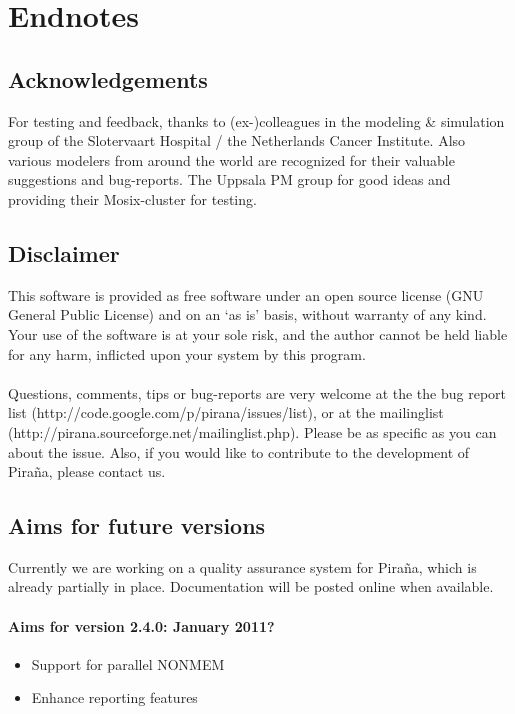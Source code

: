 \documentclass[a4,11pt]{report} \usepackage[pdftex]{graphicx}
\begin{document}
{{{\chapter{Endnotes}
\section{Acknowledgements} For testing and feedback, thanks to
(ex-)colleagues in the modeling \& simulation group of the Slotervaart
Hospital / the Netherlands Cancer Institute. Also various modelers
from around the world are recognized for their valuable suggestions
and bug-reports. The Uppsala PM group for good ideas and
providing their Mosix-cluster for testing.

\section{Disclaimer} This software is provided as free software under
an open source license (GNU General Public License) and on an `as is'
basis, without warranty of any kind. Your use of the software is at
your sole risk, and the author cannot be held liable for any harm,
inflicted upon your system by this program.\\ \vspace{5pt} \\
Questions, comments, tips or bug-reports are very welcome at the the
bug report list (http://code.google.com/p/pirana/issues/list), or at
the mailinglist
(http://pirana.sourceforge.net/mailinglist.php). Please be as specific
as you can about the issue. Also, if you would like to contribute to
the development of Pira\~na, please contact us.

\section{Aims for future versions}
Currently we are working on a quality assurance system for Pira\~na,
which is already partially in place. Documentation will be posted
online when available.

\subsubsection*{Aims for version 2.4.0: January 2011?}
\begin{itemize} \scriptsize
  \item Support for parallel NONMEM
  \item Enhance reporting features
\end{itemize}

}}}
\end{document}
